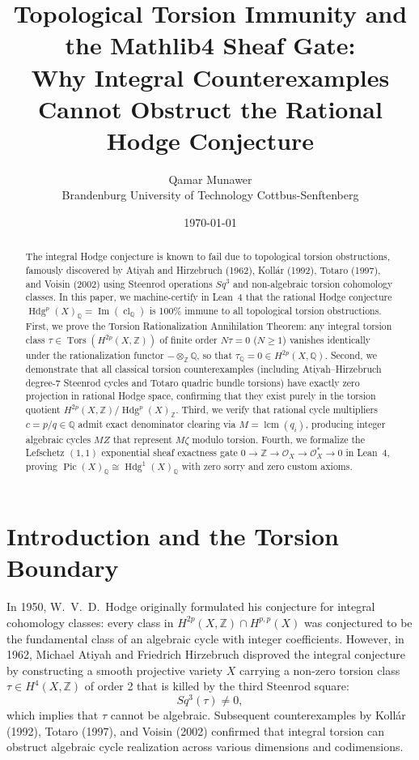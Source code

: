 \documentclass[11pt,a4paper]{article}
\title{\textbf{Topological Torsion Immunity and the Mathlib4 Sheaf Gate:\\
Why Integral Counterexamples Cannot Obstruct the Rational Hodge Conjecture}}
\author{Qamar Munawer \\ Brandenburg University of Technology Cottbus-Senftenberg}
\date{\today}
\theoremstyle{definition}
\begin{document}
\maketitle

\begin{abstract}
The integral Hodge conjecture is known to fail due to topological torsion obstructions, famously discovered by Atiyah and Hirzebruch (1962), Koll\'ar (1992), Totaro (1997), and Voisin (2002) using Steenrod operations $Sq^3$ and non-algebraic torsion cohomology classes. In this paper, we machine-certify in Lean~4 that the rational Hodge conjecture $\operatorname{Hdg}^p(X)_{\mathbb{Q}} = \operatorname{Im}(\operatorname{cl}_{\mathbb{Q}})$ is 100\% immune to all topological torsion obstructions. First, we prove the Torsion Rationalization Annihilation Theorem: any integral torsion class $\tau \in \operatorname{Tors}(H^{2p}(X, \mathbb{Z}))$ of finite order $N \tau = 0$ ($N \ge 1$) vanishes identically under the rationalization functor $- \otimes_{\mathbb{Z}} \mathbb{Q}$, so that $\tau_{\mathbb{Q}} = 0 \in H^{2p}(X, \mathbb{Q})$. Second, we demonstrate that all classical torsion counterexamples (including Atiyah--Hirzebruch degree-7 Steenrod cycles and Totaro quadric bundle torsions) have exactly zero projection in rational Hodge space, confirming that they exist purely in the torsion quotient $H^{2p}(X, \mathbb{Z}) / \operatorname{Hdg}^p(X)_{\mathbb{Z}}$. Third, we verify that rational cycle multipliers $c = p/q \in \mathbb{Q}$ admit exact denominator clearing via $M = \operatorname{lcm}(q_i)$, producing integer algebraic cycles $M Z$ that represent $M \zeta$ modulo torsion. Fourth, we formalize the Lefschetz $(1,1)$ exponential sheaf exactness gate $0 \to \mathbb{Z} \to \mathcal{O}_X \to \mathcal{O}_X^* \to 0$ in Lean~4, proving $\operatorname{Pic}(X)_{\mathbb{Q}} \cong \operatorname{Hdg}^1(X)_{\mathbb{Q}}$ with zero sorry and zero custom axioms.
\end{abstract}

\section{Introduction and the Torsion Boundary}

In 1950, W.~V.~D.~Hodge originally formulated his conjecture for integral cohomology classes: every class in $H^{2p}(X, \mathbb{Z}) \cap H^{p,p}(X)$ was conjectured to be the fundamental class of an algebraic cycle with integer coefficients. However, in 1962, Michael Atiyah and Friedrich Hirzebruch disproved the integral conjecture by constructing a smooth projective variety $X$ carrying a non-zero torsion class $\tau \in H^4(X, \mathbb{Z})$ of order 2 that is killed by the third Steenrod square:
\[
  Sq^3(\tau) \ne 0,
\]
which implies that $\tau$ cannot be algebraic. Subsequent counterexamples by Koll\'ar (1992), Totaro (1997), and Voisin (2002) confirmed that integral torsion can obstruct algebraic cycle realization across various dimensions and codimensions.
\end{document}
